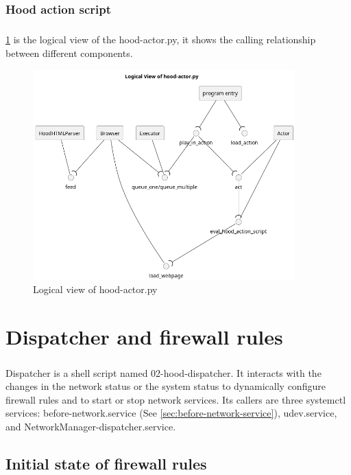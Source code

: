 \documentclass[mscthesis]{usiinfthesis}
\begin{document}
\subsection{Hood action script}
\paragraph{}
\cref{fig:actor-logic-view} is the logical view of the hood-actor.py, it shows the calling relationship between different components.
\begin{figure}[H]
  \includegraphics[width=0.9\textwidth]{graphics/puml/actor.png}
  \caption{Logical view of hood-actor.py}
  \label{fig:actor-logic-view}
\end{figure}

\chapter{Dispatcher and firewall rules}\label{cha:dispatcher}
\paragraph{}
Dispatcher is a shell script named 02-hood-dispatcher. It interacts with the changes in the network status or the system status to dynamically configure firewall rules and to start or stop network services. Its callers are three systemctl services: before-network.service (See \cref{sec:before-network-service}), udev.service, and NetworkManager-dispatcher.service.

\section{Initial state of firewall rules}
\end{document}
